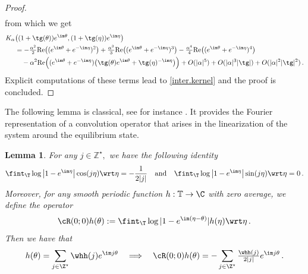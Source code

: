 \documentclass[a4paper,reqno,10pt]{article}
\newtheorem{lem}{Lemma}[section]
\begin{document}
\begin{proof}
\begin{equation}
\begin{aligned}
  	\end{aligned}
  \end{equation}
  from which we get
    \begin{equation}
  	\begin{aligned}
  		K_{\alpha}&\big((1+\tg(\theta))e^{\im\theta} ,(1+\tg(\eta))e^{\im\eta}\big) \\
  		&   = - \tfrac{\alpha^2}{2}{\rm Re}\big( (e^{\im\theta}+e^{-\im\eta})^2 \big)  + \tfrac{\alpha^3}{3}{\rm Re}\big( (e^{\im\theta}+e^{-\im\eta})^3 \big) - \tfrac{\alpha^4}{4}{\rm Re}\big( (e^{\im\theta}+e^{-\im\eta})^4 \big)  \\
  		& \quad - \alpha^2 {\rm Re} \Big( (e^{\im\theta}+e^{-\im\eta}) \big( \tg(\theta)e^{\im\theta} +\tg(\eta)^{-\im\eta}  \big) \Big) + O(|\alpha|^5) + O(|\alpha|^3 |\tg|) + O(|\alpha|^2 |\tg|^2) \,.
  	\end{aligned}
  \end{equation}
  Explicit computations of these terms lead to \eqref{inter.kernel} and the proof is concluded.
\end{proof}
The following lemma is classical, see for instance \cite[Lemma 3.3]{Casrro}. It provides the Fourier representation of a convolution operator that arises in the linearization of the system around the equilibrium state.
\begin{lem}\label{lemma.cR.00}
For any $j\in \mathbb{Z}^\star,$ we have the following identity
$$
 \fint_{\T} \log\big| 1-  e^{\im\eta} \big| \cos( j\eta)  \wrt\eta=-\frac{1}{2|j|} \quad \text{and} \quad  \fint_{\T} \log\big| 1-  e^{\im\eta} \big| \sin( j\eta)  \wrt\eta=0\,.
$$
Moreover, for any smooth periodic function $h:\mathbb{T}\to \C$ with zero average, we define the operator
    $$
    \cR(0;0)h(\theta):=  \fint_{\T} \log|1-e^{\im(\eta-\theta)}| h(\eta) \wrt \eta \,.
    $$
    Then we have that
	\begin{equation}
		h(\theta)= \sum_{j\in\Z^\star} \whh(j) e^{\im j\theta} \quad  \Longrightarrow \quad  \cR(0;0)h(\theta)=- \sum_{j\in\Z^\star} \tfrac{\whh(j)}{2|j|} e^{\im j \theta} \,.
	\end{equation}
\end{lem}
\end{document}
